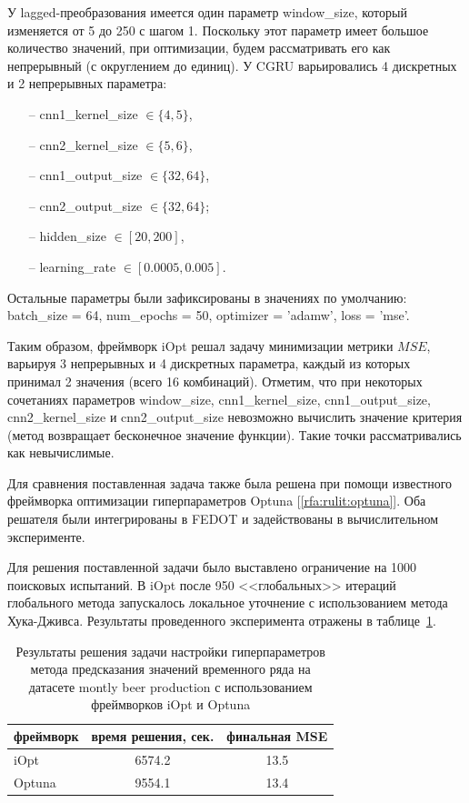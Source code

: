 \documentclass[a4paper,12pt,russian]{article}
\begin{document}

У lagged-преобразования имеется один параметр window\_size, который изменяется от 5 до 250 с шагом 1. Поскольку этот параметр имеет большое количество значений, при оптимизации, будем рассматривать его как непрерывный (с округлением до единиц). У CGRU варьировались 4 дискретных и 2 непрерывных параметра:
\begin{itemize}
\item[--] cnn1\_kernel\_size $\in \{4, 5\}$,
\item[--] cnn2\_kernel\_size $\in \{5, 6\}$, 
\item[--] cnn1\_output\_size $\in \{32, 64\}$, 
\item[--] cnn2\_output\_size $\in \{32, 64\}$;
\item[--] hidden\_size $\in [20, 200]$, 
\item[--] learning\_rate $\in [0.0005, 0.005]$.
\end{itemize}
Остальные параметры были зафиксированы в значениях по умолчанию: batch\_size = 64, num\_epochs = 50, optimizer = 'adamw', loss = 'mse'.

Таким образом, фреймворк iOpt решал задачу минимизации метрики $MSE$, варьируя 3 непрерывных и 4 дискретных параметра, каждый из которых принимал 2 значения (всего 16 комбинаций). Отметим, что при некоторых сочетаниях параметров window\_size, cnn1\_kernel\_size, cnn1\_output\_size, cnn2\_kernel\_size и cnn2\_output\_size невозможно вычислить значение критерия (метод возвращает бесконечное значение функции). Такие точки рассматривались как невычислимые.

Для сравнения поставленная задача также была решена при помощи известного фреймворка оптимизации гиперпараметров Optuna [\ref{rfa:rulit:optuna}].
Оба решателя были интегрированы в FEDOT и задействованы в вычислительном эксперименте.

Для решения поставленной задачи было выставлено ограничение на 1000 поисковых испытаний. В iOpt после 950 <<глобальных>> итераций глобального метода запускалось локальное уточнение с использованием метода Хука-Дживса. %
Результаты проведенного эксперимента отражены в таблице~\ref{tab1}. 

\begin{table}[h!]
\centering
\caption{Результаты решения задачи настройки гиперпараметров метода предсказания значений временного ряда на датасете montly beer production с использованием фреймворков iOpt и Optuna}\label{tab1}
\begin{tabular}{|l|c|c|}
\hline
фреймворк & время решения, сек. & финальная MSE \\
\hline \hline
iOpt & 6574.2 & 13.5 \\
\hline
Optuna &  9554.1 & 13.4 \\
\hline
\end{tabular}
\end{table}
\end{document}
